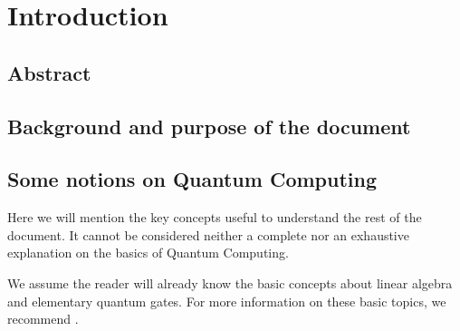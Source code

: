 
\chapter{Introduction}
\label{chp:intro}

\section{Abstract}


\section{Background and purpose of the document}


\section{Some notions on Quantum Computing}

Here we will mention the key concepts useful to understand the rest of the document. It cannot be considered neither a complete nor an exhaustive explanation on the basics of Quantum Computing.

We assume the reader will already know the basic concepts about linear algebra and elementary quantum gates. For more information on these basic topics, we recommend \cite{helwer2018quantum}.

